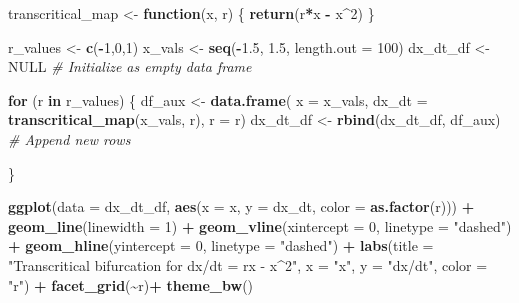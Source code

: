 \documentclass[
]{article}
\newenvironment{Shaded}{\begin{snugshade}}{\end{snugshade}}
\newcommand{\AttributeTok}[1]{\textcolor[rgb]{0.13,0.29,0.53}{#1}}
\newcommand{\CommentTok}[1]{\textcolor[rgb]{0.56,0.35,0.01}{\textit{#1}}}
\newcommand{\ConstantTok}[1]{\textcolor[rgb]{0.56,0.35,0.01}{#1}}
\newcommand{\ControlFlowTok}[1]{\textcolor[rgb]{0.13,0.29,0.53}{\textbf{#1}}}
\newcommand{\DecValTok}[1]{\textcolor[rgb]{0.00,0.00,0.81}{#1}}
\newcommand{\FloatTok}[1]{\textcolor[rgb]{0.00,0.00,0.81}{#1}}
\newcommand{\FunctionTok}[1]{\textcolor[rgb]{0.13,0.29,0.53}{\textbf{#1}}}
\newcommand{\NormalTok}[1]{#1}
\newcommand{\OtherTok}[1]{\textcolor[rgb]{0.56,0.35,0.01}{#1}}
\newcommand{\SpecialCharTok}[1]{\textcolor[rgb]{0.81,0.36,0.00}{\textbf{#1}}}
\newcommand{\StringTok}[1]{\textcolor[rgb]{0.31,0.60,0.02}{#1}}
\begin{document}
\begin{Shaded}
\begin{Highlighting}[]
\NormalTok{transcritical\_map }\OtherTok{\textless{}{-}} \ControlFlowTok{function}\NormalTok{(x, r) \{}
  \FunctionTok{return}\NormalTok{(r}\SpecialCharTok{*}\NormalTok{x  }\SpecialCharTok{{-}}\NormalTok{ x}\SpecialCharTok{\^{}}\DecValTok{2}\NormalTok{)}
\NormalTok{\}}

\NormalTok{r\_values }\OtherTok{\textless{}{-}} \FunctionTok{c}\NormalTok{(}\SpecialCharTok{{-}}\DecValTok{1}\NormalTok{,}\DecValTok{0}\NormalTok{,}\DecValTok{1}\NormalTok{)}
\NormalTok{x\_vals }\OtherTok{\textless{}{-}} \FunctionTok{seq}\NormalTok{(}\SpecialCharTok{{-}}\FloatTok{1.5}\NormalTok{, }\FloatTok{1.5}\NormalTok{, }\AttributeTok{length.out =} \DecValTok{100}\NormalTok{)}
\NormalTok{dx\_dt\_df }\OtherTok{\textless{}{-}} \ConstantTok{NULL}  \CommentTok{\# Initialize as empty data frame}

\ControlFlowTok{for}\NormalTok{ (r }\ControlFlowTok{in}\NormalTok{ r\_values) \{}
\NormalTok{  df\_aux }\OtherTok{\textless{}{-}} \FunctionTok{data.frame}\NormalTok{(}
    \AttributeTok{x =}\NormalTok{ x\_vals,}
    \AttributeTok{dx\_dt =} \FunctionTok{transcritical\_map}\NormalTok{(x\_vals, r),}
    \AttributeTok{r =}\NormalTok{ r)}
\NormalTok{  dx\_dt\_df }\OtherTok{\textless{}{-}} \FunctionTok{rbind}\NormalTok{(dx\_dt\_df, df\_aux)  }\CommentTok{\# Append new rows}

\NormalTok{\}}

\FunctionTok{ggplot}\NormalTok{(}\AttributeTok{data =}\NormalTok{ dx\_dt\_df, }
       \FunctionTok{aes}\NormalTok{(}\AttributeTok{x =}\NormalTok{ x, }\AttributeTok{y =}\NormalTok{ dx\_dt, }\AttributeTok{color =} \FunctionTok{as.factor}\NormalTok{(r))) }\SpecialCharTok{+}
  \FunctionTok{geom\_line}\NormalTok{(}\AttributeTok{linewidth =} \DecValTok{1}\NormalTok{) }\SpecialCharTok{+}
  \FunctionTok{geom\_vline}\NormalTok{(}\AttributeTok{xintercept =} \DecValTok{0}\NormalTok{, }\AttributeTok{linetype =} \StringTok{"dashed"}\NormalTok{) }\SpecialCharTok{+}
  \FunctionTok{geom\_hline}\NormalTok{(}\AttributeTok{yintercept =} \DecValTok{0}\NormalTok{, }\AttributeTok{linetype =} \StringTok{"dashed"}\NormalTok{) }\SpecialCharTok{+}
  \FunctionTok{labs}\NormalTok{(}\AttributeTok{title =} \StringTok{"Transcritical bifurcation for dx/dt = rx {-} x\^{}2"}\NormalTok{, }
       \AttributeTok{x =} \StringTok{"x"}\NormalTok{, }\AttributeTok{y =} \StringTok{"dx/dt"}\NormalTok{, }\AttributeTok{color =} \StringTok{"r"}\NormalTok{) }\SpecialCharTok{+}
  \FunctionTok{facet\_grid}\NormalTok{(}\SpecialCharTok{\textasciitilde{}}\NormalTok{r)}\SpecialCharTok{+}
  \FunctionTok{theme\_bw}\NormalTok{()}
\end{Highlighting}
\end{Shaded}
\end{document}
